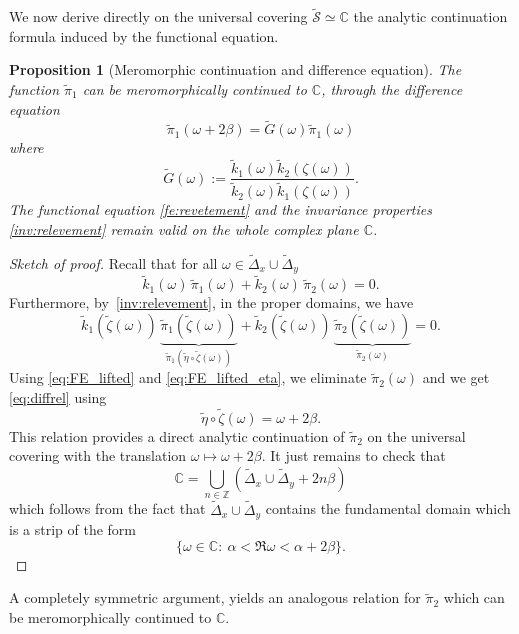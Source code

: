 \documentclass[11pt]{article}
\newtheorem{prop}[thm]{Proposition}
\theoremstyle{definition}
\begin{document}
We now derive directly on the universal covering $\widetilde{\mathcal S}\simeq\mathbb{C}$ the analytic continuation formula induced by the functional equation.
\begin{prop}[Meromorphic continuation and difference equation] The function $\widetilde\pi_1$ can be meromorphically continued to $\mathbb{C}$, through the difference equation
\begin{equation}
\widetilde\pi_1(\omega+2\beta)=\widetilde G(\omega) \widetilde\pi_1(\omega)
\label{eq:diffrel}
\end{equation}
where
\begin{equation}
\widetilde G(\omega):=\frac{\widetilde k_1(\omega) \widetilde k_2(\zeta (\omega))}{\widetilde k_2(\omega) \widetilde k_1(\zeta (\omega))} .
\label{tildeG}
\end{equation}
The functional equation \eqref{fe:revetement} and the invariance properties \eqref{inv:relevement} remain valid on the whole complex plane $\mathbb{C}$.
\end{prop}
\begin{proof}[Sketch of proof]
Recall that for all $\omega\in\widetilde{\Delta}_x \cup \widetilde{\Delta}_y$
\begin{equation}
\widetilde k_1(\omega)\,\widetilde{\pi}_1(\omega)
+
\widetilde k_2(\omega)\,\widetilde{\pi}_2(\omega)
=0.
\label{eq:FE_lifted}
\end{equation}
Furthermore, by~\eqref{inv:relevement}, in the proper domains, we have 
\begin{equation}
\widetilde k_1(\widetilde{\zeta}(\omega))
\,
\underbrace{\widetilde{\pi}_1(\widetilde{\zeta}(\omega))}_{\widetilde{\pi}_1(\widetilde{\eta}\circ\widetilde{\zeta}(\omega))}
+
\widetilde k_2(\widetilde{\zeta}(\omega))\,\underbrace{\widetilde{\pi}_2(\widetilde{\zeta}(\omega))}_{\widetilde{\pi}_2(\omega)}
=0.
\label{eq:FE_lifted_eta}
\end{equation}
Using \eqref{eq:FE_lifted} and \eqref{eq:FE_lifted_eta}, we eliminate $\widetilde{\pi}_2(\omega)$ and we get \eqref{eq:diffrel}
using
\[
\widetilde{\eta}\circ\widetilde{\zeta}(\omega)=\omega+2\beta.
\]
This relation provides a direct analytic continuation of $\widetilde{\pi}_2$ on the universal covering with the translation $\omega\mapsto\omega+2\beta$.
It just remains to check that
$$
\mathbb{C}=
\bigcup_{n\in\mathbb{Z}} \left(
\widetilde{\Delta}_x \cup \widetilde{\Delta}_y+2n\beta \right)
$$
which follows from the fact that $\widetilde{\Delta}_x \cup \widetilde{\Delta}_y$ contains the fundamental domain which is a strip of the form
\[
\{\omega\in\mathbb{C}:\ \alpha<\Re\omega<\alpha+2\beta\}.
\]
%
\end{proof}
A completely symmetric argument, yields an analogous relation for $\widetilde{\pi}_2$ which can be meromorphically continued to $\mathbb{C}$.
\end{document}
